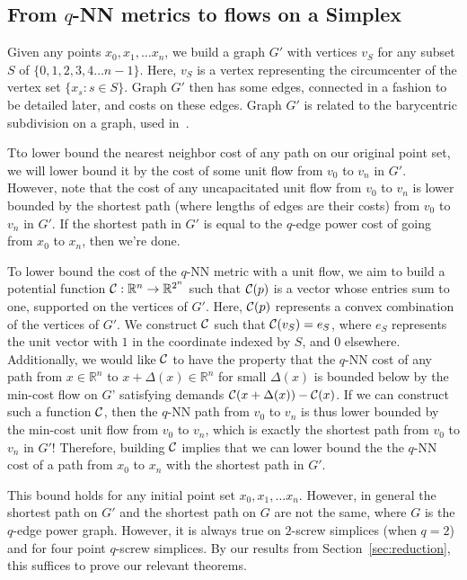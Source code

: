 \subsection{From $q$-NN metrics to flows on a Simplex}

Given any points $x_0, x_1, \ldots x_n$, we build a graph $G'$ with
vertices $v_S$ for any subset $S$ of
$\{0,1,2,3,4 \ldots n-1 \}$. Here, $v_S$ is a vertex representing the
circumcenter of the vertex set $\{x_s: s \in S\}$. Graph $G'$ then has some
edges, connected in a fashion to be detailed later, and costs on these edges.
Graph $G'$ is related to the barycentric subdivision on a graph, used
in~\cite{}.

Tto lower bound the nearest neighbor cost of any path on our original point
set, we will lower bound it by the cost of some unit flow from
$v_0$ to $v_n$ in $G'$. However, note that the cost of any uncapacitated
unit flow from $v_0$ to $v_n$ is lower bounded by the shortest path (where
lengths of edges are their costs) from $v_0$ to $v_n$ in $G'$.
If the shortest path in $G'$ is equal to the $q$-edge power cost of going
from $x_0$ to $x_n$, then we're done.

To lower bound the cost of the $q$-NN metric with a unit flow, we aim to build
a potential function $\mathcal{C}:\mathbb{R}^n \rightarrow \mathbb{R}^{2^n}$ such
that $\mathcal{C}(p)$ is a vector whose entries sum to one, supported on the
vertices of $G'$. Here, $\mathcal{C}(p)$
represents a convex combination of the vertices of $G'$. We construct $\mathcal{C}$
such that $\mathcal{C}(v_S) = e_S$, where $e_S$ represents the unit vector with $1$
in the coordinate indexed by $S$, and $0$ elsewhere. Additionally, we would
like $\mathcal{C}$ to have
the property that the $q$-NN cost of any path from $x \in \mathbb{R}^n$ to
$x+\Delta(x) \in \mathbb{R}^n$ for small $\Delta(x)$ is
bounded below by the min-cost flow on $G’$ satisfying demands
$\mathcal{C}(x+\Delta(x)) - \mathcal{C}(x)$. If we can construct such a function $\mathcal{C}$,
then the $q$-NN path from $v_0$ to $v_n$ is thus lower bounded by the min-cost
unit flow from $v_0$ to $v_n$, which is exactly the shortest path from
$v_0$ to $v_n$ in $G'$!
 Therefore, building $\mathcal{C}$ implies that we can lower bound the
the $q$-NN cost of a path from $x_0$ to $x_n$ with the shortest path in $G'$.

This bound holds for any initial point set $x_0, x_1, \ldots x_n$. However,
in general the shortest path on $G'$ and the shortest path on $G$ are not
the same, where $G$ is the $q$-edge power graph.  However, it is always
true on $2$-screw simplices (when $q=2$) and for four point $q$-screw
simplices. By our results from Section~\ref{sec:reduction}, this suffices
to prove our relevant theorems.

